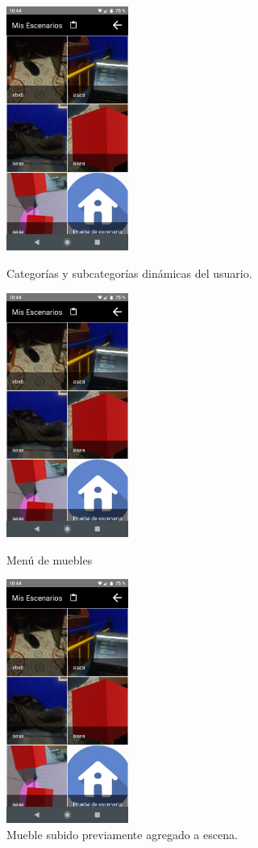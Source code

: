 \begin{figure}[h!]
	\begin{minipage}{0.32\textwidth}
		\centering
		\includegraphics[width=4cm,height=8cm]{imagenes/desarrollo/app/scenarios.png}
		\caption{Categorías y subcategorías dinámicas del usuario.}
		\label{fig:appmenucat}
	\end{minipage}\hfill
	\begin{minipage}{0.32\textwidth}
		\centering
		\includegraphics[width=4cm,height=8cm]{imagenes/desarrollo/app/scenarios.png}
		\caption{Menú de muebles}
		\label{fig:appmenu}
	\end{minipage}\hfill
	\begin{minipage}{0.32\textwidth}
		\centering
		\includegraphics[width=4cm,height=8cm]{imagenes/desarrollo/app/scenarios.png}
		\caption{Mueble subido previamente agregado a escena.}
		\label{fig:appfurn}
	\end{minipage}\hfill
\end{figure}

